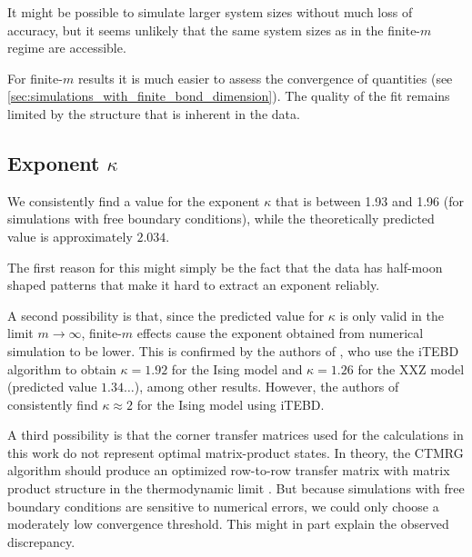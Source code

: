 It might be possible to simulate larger system sizes without much loss of accuracy,
but it seems unlikely that the same system sizes as in the finite-$m$ regime are accessible.

For finite-$m$ results it is much easier to assess the convergence of quantities (see
\autoref{sec:simulations_with_finite_bond_dimension}).
The quality of the fit remains limited by the structure that is inherent in the data.

\subsection{Exponent $\kappa$}

We consistently find a value for the exponent $\kappa$ that is between 1.93 and 1.96 (for simulations with free
boundary conditions), while the theoretically predicted value is approximately $2.034$.

The first reason for this might simply be the fact that the data has half-moon shaped patterns that make it
hard to extract an exponent reliably.

A second possibility is that, since the predicted value for $\kappa$ is only valid in the limit $m \to \infty$,
finite-$m$ effects cause the exponent obtained from numerical simulation to be lower.
This is confirmed by the authors of \cite{pollmann2009theory}, who use the iTEBD algorithm \cite{vidal2007classical} to
obtain $\kappa = 1.92$ for the Ising model and $\kappa = 1.26$ for the XXZ model (predicted value $1.34\dots$),
among other results.
However, the authors of \cite{tagliacozzo2008scaling} consistently find $\kappa \approx 2$ for the Ising model using
iTEBD.

A third possibility is that the corner transfer matrices used for the calculations in this work do not represent optimal
matrix-product states.
In theory, the CTMRG algorithm should produce an optimized row-to-row transfer matrix with matrix product structure in
the thermodynamic limit \cite{baxter1982exactly_ctm}.
But because simulations with free boundary conditions are sensitive to numerical errors,
we could only choose a moderately low convergence threshold.
This might in part explain the observed discrepancy.
